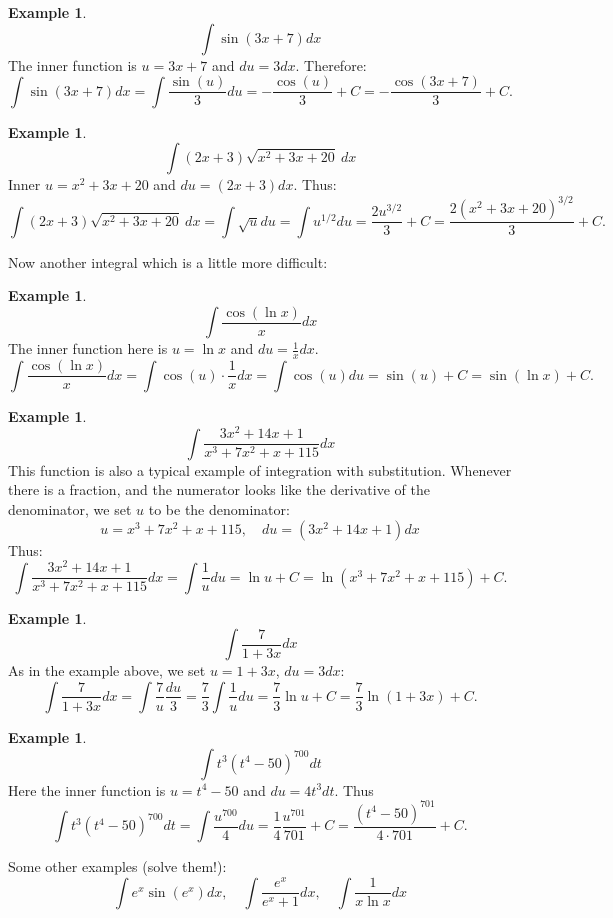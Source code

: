 \documentclass[12pt]{article}
\theoremstyle{definition}
\newtheorem{exa}[thm]{Example}
\begin{document}
\begin{exa}
$$\int \sin (3x+7) dx$$ The inner function is $u=3x+7$ and $du=3 dx$. Therefore:
$$\int \sin (3x+7) dx= \int \frac{\sin(u)}{3} du = -\frac{\cos(u)}{3} +C = -\frac{\cos(3x+7)}{3}+C.$$
\end{exa}
\eject
\begin{exa}
$$\int (2x+3)\sqrt{x^2+3x+20}\ dx $$ Inner $u=x^2+3x+20$ and $du=(2x+3)dx$. Thus:
$$\int (2x+3)\sqrt{x^2+3x+20}\ dx =
\int \sqrt{u} du= \int u^{1/2} du = \frac{2u^{3/2}}{3} + C = \frac{2(x^2+3x+20)^{3/2}}{3} +C.$$
\end{exa}

Now another integral which is a little more difficult:

\begin{exa}
$$\int \frac{\cos (\ln x)}{x} dx$$ The inner function here is $u=\ln x$ and $du= \frac{1}{x} dx$.
$$\int \frac{\cos(\ln x)}{x} dx = \int \cos (u) \cdot \frac{1}{x} dx= \int \cos (u) du = \sin (u) +C= \sin(\ln x) +C.$$
\end{exa}

\begin{exa}
$$\int \frac{3x^2+14x+1}{x^3+7x^2+x+115} dx $$
This function is also a typical example of integration with substitution. Whenever there is a fraction, and the numerator
looks like the derivative of the denominator, we set $u$ to be the denominator:
$$u=x^3+7x^2+x+115, \quad du = (3x^2 +14x +1) dx$$
Thus:
$$\int \frac{3x^2+14x+1}{x^3+7x^2+x+115} dx = \int \frac{1}{u} du = \ln u + C= \ln (x^3+7x^2+x+115) + C.$$
\end{exa}

\begin{exa}

$$\int \frac{7}{1+3x} dx $$
As in the example above, we set $u=1+3x$, $du=3 dx $:
$$\int \frac{7}{1+3x} dx = \int \frac{7}{u} \frac{du}{3} = \frac{7}{3} \int \frac{1}{u} du = \frac{7}{3} \ln u + C =
\frac{7}{3} \ln (1+3x) + C.$$
\end{exa}

\begin{exa}
$$\int t^3(t^4-50)^{700} dt$$
Here the inner function is $u=t^4-50$ and $du=4t^3 dt$. Thus
$$\int t^3(t^4-50)^{700} dt = \int \frac{u^{700}}{4} du=\frac{1}{4} \frac{u^{701}}{701} +C=
\frac{(t^4-50)^{701}}{4\cdot 701} +C.$$
\end{exa}

Some other examples (solve them!):
$$ \int e^x \sin (e^x) dx,\quad \int \frac{e^x}{e^x+1} dx, \quad \int \frac{1}{x\ln x } dx$$
\end{document}
